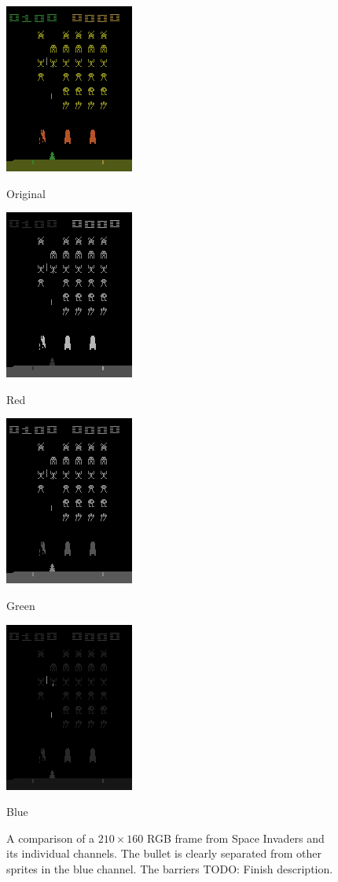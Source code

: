 \begin{figure}[h!]
\centering
\captionsetup{justification=centering}
\begin{multicols}{4}
    \includegraphics[scale=0.7]{figures/methods/separating_colour_spaces_original.png}
    \caption{Original}\par
    \includegraphics[scale=0.7]{figures/methods/separating_colour_spaces_r.png}
    \caption{Red}\par
    \includegraphics[scale=0.7]{figures/methods/separating_colour_spaces_g.png}
    \caption{Green}\par
    \includegraphics[scale=0.7]{figures/methods/separating_colour_spaces_b.png}
    \caption{Blue}
\end{multicols}
\caption{A comparison of a $210 \times 160$ RGB frame from Space Invaders and its individual channels. The bullet is clearly separated from other sprites in the blue channel. The barriers TODO: Finish description.}
\label{fig:even_and_odd_frames_space_invaders}
\end{figure}



